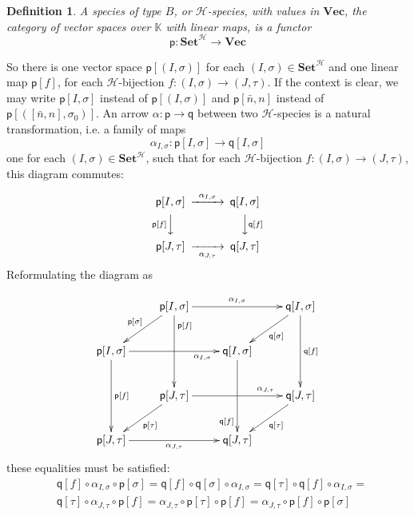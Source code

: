 \documentclass[11pt,reqno]{amsart}
\numberwithin{equation}{section}
\newtheorem{definition}[theorem]{Definition}
\def\K{{\mathbb K}}
\def\SetB{{\mathbf{Set}^{\H}}}
\def\Vec{{\mathbf{Vec}}}
\def\H{{\mathcal{H}}}
\def\p{{\textsf{p}}}
\def\q{{\textsf{q}}}
\begin{document}
\begin{definition}
A species of type $B$, or $\H$-species, with values in $\Vec$, the category of vector spaces over $\K$ with linear maps, is a functor
$$\p:\SetB\rightarrow \Vec$$
\end{definition}

So there is one vector space $\p[(I,\sigma)]$ for each $(I,\sigma)\in \SetB$ and one linear map $\p[f]$, for each $\H$-bijection $f\colon (I,\sigma)\rightarrow (J,\tau)$. If the context is clear, we may write $\p[I,\sigma]$ instead of $\p[(I,\sigma)]$ and $\p[\bar{n},n]$ instead of $\p[([\bar{n},n],\sigma_0)]$. An arrow $\alpha\colon \p\rightarrow \q$ between two $\H$-species is a natural transformation, i.e. a family of maps
$$\alpha_{I,\sigma}\colon\p[I,\sigma]\rightarrow \q[I,\sigma]$$
one for each $(I,\sigma)\in\SetB$, such that for each $\H$-bijection $f\colon (I,\sigma)\rightarrow (J,\tau)$,
this diagram commutes:

\begin{equation}
\begin{CD}
\p[I,\sigma] @>\alpha_{I,\sigma}>> \q[I,\sigma] \\
@V{\p[f]}VV  @VV{\q[f]}V\\
\p[J,\tau] @>>\alpha_{J,\tau}> \q[J,\tau]
\end{CD}
\end{equation}
Reformulating the diagram as

\begin{equation}
\xymatrix{ & \p[I,\sigma] \ar[rr]^{\alpha_{I,\sigma}} \ar[dd]^<<<<{\p[f]} \ar[dl]_{\p[\sigma]} & & \q[I,\sigma] \ar[dd]^{\q[f]} \ar[dl]^{\q[\sigma]} \\
\p[I,\sigma] \ar[rr]_>>>>>>{\alpha_{I,\sigma}} \ar[dd]^{\p[f]} & & \q[I,\sigma] \ar[dd]_>>>>{\q[f]} \\
& \p[J,\tau] \ar[rr]^>>>>>>{\alpha_{J,\tau}} \ar[dl]^{\p[\tau]} & & \q[J,\tau] \ar[dl]^{\q[\tau]}\\
\p[J,\tau] \ar[rr]_{\alpha_{J,\tau}} & & \q[J,\tau]}
\end{equation}
these equalities must be satisfied:
\begin{equation}
\begin{aligned}
&\q[f]\circ\alpha_{I,\sigma}\circ\p[\sigma]  = \q[f]\circ\q[\sigma]\circ\alpha_{I,\sigma} = \q[\tau]\circ\q[f]\circ\alpha_{I,\sigma}=\\
&\q[\tau]\circ\alpha_{J,\tau}\circ\p[f] = \alpha_{J,\tau}\circ\p[\tau]\circ\p[f]  = \alpha_{J,\tau}\circ\p[f]\circ\p[\sigma]
\end{aligned}
\end{equation}
\end{document}
